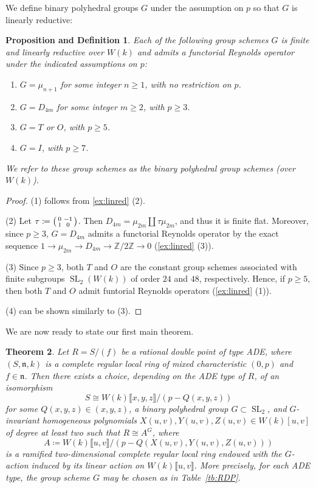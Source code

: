 \documentclass[uplatex,11pt,a4paper]{amsart} %
\numberwithin{equation}{section}
\numberwithin{figure}{section}
\numberwithin{table}{section}
\theoremstyle{plain}
\newtheorem{theorem}{Theorem}[section]
\newtheorem{proposition-definition}[theorem]{Proposition and Definition}
\theoremstyle{definition}
\newcommand{\Z}{\mathbb{Z}}
\newcommand{\n}{\mathfrak{n}}
\DeclareMathOperator{\SL}{SL}
\newenvironment{psmatrix}{\left(\begin{smallmatrix}}{\end{smallmatrix}\right)}
\begin{document}
We define binary polyhedral groups $G$ under the assumption on $p$ so that $G$ is linearly reductive:

\begin{proposition-definition}
\label{prop-def:binary}
Each of the following group schemes $G$ is finite and linearly reductive over $W(k)$ and admits a functorial Reynolds operator under the indicated assumptions on $p$:
\begin{enumerate}
\item $G=\mu_{n+1}$ for some integer $n\geq1$, with no restriction on $p$.
\item $G=D_{4m}$ for some integer $m\geq2$, with $p\geq3$.
\item $G=T$ or $O$, with $p\geq5$.
\item $G=I$, with $p\geq7$.
\end{enumerate}
We refer to these group schemes as the \emph{binary polyhedral group schemes (over $W(k)$)}.
\end{proposition-definition}

\begin{proof}
(1) follows from \cref{ex:linred} (2).

(2) Let $\tau\coloneqq\begin{psmatrix}0 & -1 \\ 1 & 0 \end{psmatrix}$. Then $D_{4m}=\mu_{2m}\coprod\tau\mu_{2m}$, and thus it is finite flat. Moreover, since $p\geq 3$, $G=D_{4m}$ admits a functorial Reynolds operator by the exact sequence $1\to \mu_{2m} \to D_{4m} \to \Z/2\Z\to 0$ (\cref{ex:linred} (3)).

(3) Since $p\geq 3$, both $T$ and $O$ are the constant group schemes associated with finite subgroups $\SL_2(W(k))$ of order $24$ and $48$, respectively. Hence, if $p\geq 5$, then both $T$ and $O$ admit funtorial Reynolds operators (\cref{ex:linred} (1)).

(4) can be shown similarly to (3).
\end{proof}

We are now ready to state our first main theorem.

\begin{theorem}
\label{thm:RDPG}
Let $R=S/(f)$ be a rational double point of type ADE, where $(S,\n,k)$ is a complete regular local ring of mixed characteristic $(0,p)$ and $f\in\n$. 
Then there exists a choice, depending on the ADE type of $R$, of an isomorphism
\[
S\cong W(k)\llbracket x,y,z\rrbracket/(p-Q(x,y,z))
\]
for some $Q(x,y,z)\in (x,y,z)$, a binary polyhedral group $G\subset\SL_2$, and $G$-invariant homogeneous polynomials $X(u,v),Y(u,v),Z(u,v)\in W(k)[u,v]$ of degree at least two such that $R\cong A^G$, where 
\[
A\coloneqq W(k)\llbracket u,v\rrbracket/(p-Q(X(u,v),Y(u,v),Z(u,v)))
\]
is a ramified two-dimensional complete regular local ring endowed with the $G$-action induced by its linear action on $W(k)\llbracket u,v\rrbracket$. 
More precisely, for each ADE type, the group scheme $G$ may be chosen as in \textup{Table~\ref{tb:RDP}}.
\end{theorem}
\end{document}
